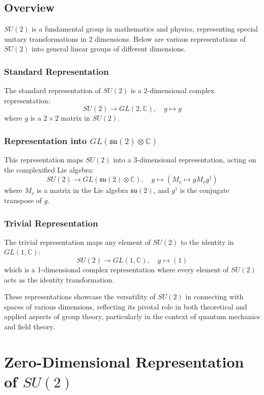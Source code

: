 \documentclass{article}
\begin{document}
\subsection*{Overview}
\(SU(2)\) is a fundamental group in mathematics and physics, representing special unitary transformations in 2 dimensions. Below are various representations of \(SU(2)\) into general linear groups of different dimensions.

\subsubsection*{Standard Representation}
The standard representation of \(SU(2)\) is a 2-dimensional complex representation:
\[
SU(2) \rightarrow GL(2, \mathbb{C}), \quad g \mapsto g
\]
where \( g \) is a \( 2 \times 2 \) matrix in \( SU(2) \).

\subsubsection*{Representation into \(GL(\mathfrak{su}(2) \otimes \mathbb{C})\)}
This representation maps \(SU(2)\) into a 3-dimensional representation, acting on the complexified Lie algebra:
\[
SU(2) \rightarrow GL(\mathfrak{su}(2) \otimes \mathbb{C}), \quad g \mapsto (M_v \mapsto g M_v g^\dagger)
\]
where \( M_v \) is a matrix in the Lie algebra \( \mathfrak{su}(2) \), and \( g^\dagger \) is the conjugate transpose of \( g \).

\subsubsection*{Trivial Representation}
The trivial representation maps any element of \(SU(2)\) to the identity in \(GL(1, \mathbb{C})\):
\[
SU(2) \rightarrow GL(1, \mathbb{C}), \quad g \mapsto (1)
\]
which is a 1-dimensional complex representation where every element of \(SU(2)\) acts as the identity transformation.

These representations showcase the versatility of \(SU(2)\) in connecting with spaces of various dimensions, reflecting its pivotal role in both theoretical and applied aspects of group theory, particularly in the context of quantum mechanics and field theory.

\section*{Zero-Dimensional Representation of \(SU(2)\)}
\end{document}
